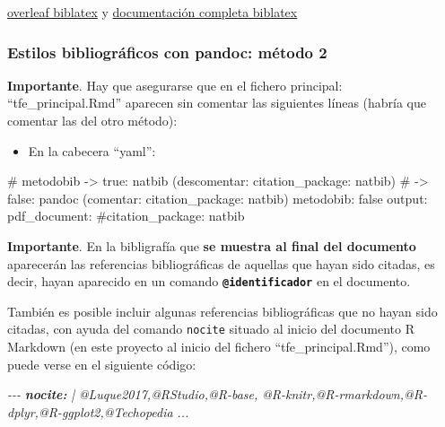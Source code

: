\documentclass[12pt,a4paper,oneside,]{article}
\newenvironment{Shaded}{\begin{snugshade}}{\end{snugshade}}
\newcommand{\AnnotationTok}[1]{\textcolor[rgb]{0.56,0.35,0.01}{\textbf{\textit{#1}}}}
\newcommand{\CommentTok}[1]{\textcolor[rgb]{0.56,0.35,0.01}{\textit{#1}}}
\newcommand{\FunctionTok}[1]{\textcolor[rgb]{0.00,0.00,0.00}{#1}}
\newcommand{\NormalTok}[1]{#1}
\providecommand{\tightlist}{%
  \setlength{\itemsep}{0pt}\setlength{\parskip}{0pt}}
\numberwithin{dummy}{section}
\theoremstyle{ocrenumbox}
\theoremstyle{blacknumex}
\theoremstyle{blacknumbox}
\theoremstyle{ocrenum}
\theoremstyle{ocrenum}
\begin{document}
\href{https://www.overleaf.com/learn/latex/Articles/Getting_started_with_BibLaTeX}{overleaf
biblatex} y
\href{http://mirror.ox.ac.uk/sites/ctan.org/macros/latex/contrib/biblatex/doc/biblatex.pdf}{documentación
completa biblatex}

\hypertarget{bibliografiametodo2}{%
\subsubsection{Estilos bibliográficos con pandoc: método
2}\label{bibliografiametodo2}}

\textbf{Importante}. Hay que asegurarse que en el fichero principal:
``tfe\_principal.Rmd'' aparecen sin comentar las siguientes líneas
(habría que comentar las del otro método):

\begin{itemize}
\tightlist
\item
  En la cabecera ``yaml'':
\end{itemize}

\footnotesize

\begin{Shaded}
\begin{Highlighting}[]
\FunctionTok{\# metodobib {-}\textgreater{} true: natbib (descomentar: citation\_package: natbib) }
\FunctionTok{\#           {-}\textgreater{} false: pandoc (comentar: citation\_package: natbib)}
\NormalTok{metodobib: false}
\NormalTok{output: }
\NormalTok{  pdf\_document: }
\NormalTok{    \#citation\_package: natbib}
\end{Highlighting}
\end{Shaded}

\normalsize

\textbf{Importante}. En la bibligrafía que \textbf{se muestra al final
del documento} aparecerán las referencias bibliográficas de aquellas que
hayan sido citadas, es decir, hayan aparecido en un comando
\textbf{\texttt{@identificador}} en el documento.

También es posible incluir algunas referencias bibliográficas que no
hayan sido citadas, con ayuda del comando \texttt{nocite} situado al
inicio del documento R Markdown (en este proyecto al inicio del fichero
``tfe\_principal.Rmd''), como puede verse en el siguiente código:

\begin{Shaded}
\begin{Highlighting}[]
\CommentTok{{-}{-}{-}}
\AnnotationTok{nocite:}\CommentTok{ | }
\CommentTok{  @Luque2017,@RStudio,@R{-}base,}
\CommentTok{  @R{-}knitr,@R{-}rmarkdown,@R{-}dplyr,@R{-}ggplot2,@Techopedia}
\CommentTok{...}
\end{Highlighting}
\end{Shaded}
\end{document}
